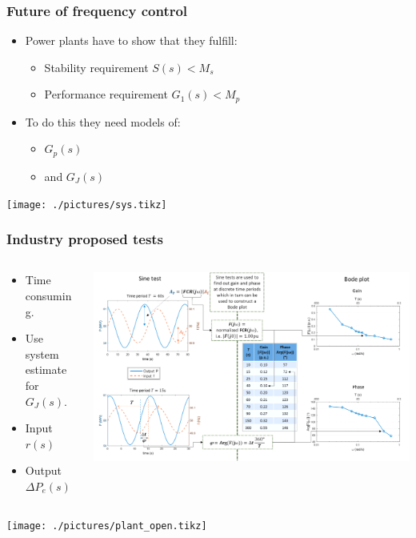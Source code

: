 \begin{frame}
	\frametitle{Future of frequency control}
		\begin{itemize}
			\item Power plants have to show that they fulfill:
				\begin{itemize}
					\item Stability requirement $S(s) < M_s$
					\item Performance requirement $G_1(s) < M_p$
				\end{itemize}
			\item To do this they need models of:
				\begin{itemize}
					\item $G_p(s)$
					\item and $G_J(s)$
				\end{itemize}
		\end{itemize}
	\texttt{[image: ./pictures/sys.tikz]}
\end{frame}
\begin{frame}
	\frametitle{Industry proposed tests}
	\begin{columns}
		\begin{column}{0.3\textwidth}
			\begin{itemize}
				\item Time consuming.
				\item Use system estimate for $G_J(s)$.
				\item Input $r(s)$
				\item Output $\Delta P_e(s)$
			\end{itemize}
		\end{column}
		\begin{column}{0.7\textwidth}
				\includegraphics[width=\textwidth]{./pictures/tests.png}
		\end{column}
	\end{columns}
	\texttt{[image: ./pictures/plant\_open.tikz]}
\end{frame}
